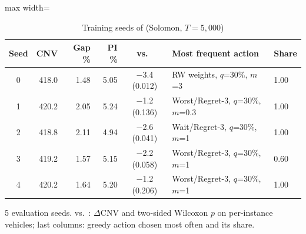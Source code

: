 \begin{table}[t]
\centering
\caption{Training seeds of \sgalns{} (Solomon, $T=5{,}000$)}\label{tab:seeds5}
\setlength{\tabcolsep}{3pt}
\begin{adjustbox}{max width=\linewidth}
\begin{tabular}{crrrcll}
\toprule
Seed & CNV & Gap \% & PI \% & vs.\ \Rw{} & Most frequent action & Share\\ \midrule
0 & 418.0 & 1.48 & 5.05 & $-$3.4 (0.012) & RW weights, $q$=30\%, $m$=3 & 1.00\\
1 & 420.2 & 2.05 & 5.24 & $-$1.2 (0.136) & Worst/Regret-3, $q$=30\%, $m$=0.3 & 1.00\\
2 & 418.8 & 2.11 & 4.94 & $-$2.6 (0.041) & Wait/Regret-3, $q$=30\%, $m$=1 & 1.00\\
3 & 419.2 & 1.57 & 5.15 & $-$2.2 (0.058) & Worst/Regret-3, $q$=30\%, $m$=1 & 0.60\\
4 & 420.2 & 1.64 & 5.20 & $-$1.2 (0.206) & Worst/Regret-3, $q$=30\%, $m$=1 & 1.00\\
\bottomrule
\end{tabular}
\end{adjustbox}
\par\vspace{2pt}\parbox{\linewidth}{\footnotesize 5 evaluation seeds. vs.\ \Rw{}: $\Delta$CNV and two-sided Wilcoxon $p$ on per-instance vehicles; last columns: greedy action chosen most often and its share.}
\end{table}
